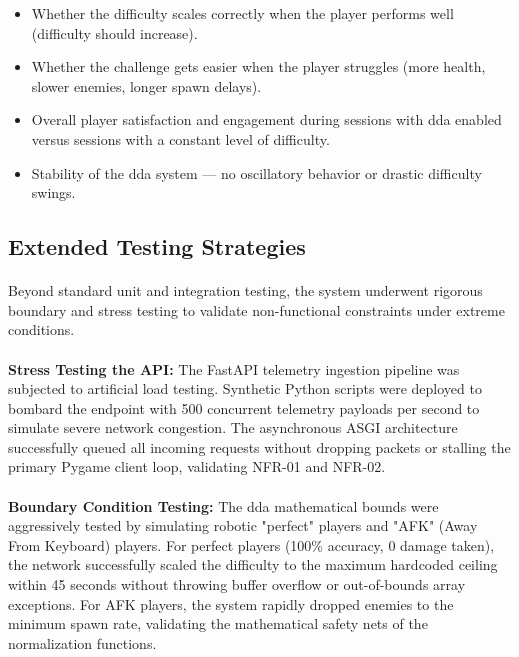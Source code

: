 \begin{itemize}
	\item Whether the difficulty scales correctly when the player performs well (difficulty should increase).
	\item Whether the challenge gets easier when the player struggles (more health, slower enemies, longer spawn delays).
	\item Overall player satisfaction and engagement during sessions with \ac{dda} enabled versus sessions with a constant level of difficulty.
	\item Stability of the \ac{dda} system — no oscillatory behavior or drastic difficulty swings.
\end{itemize}

\subsection{Extended Testing Strategies}
\paragraph{} Beyond standard unit and integration testing, the system underwent rigorous boundary and stress testing to validate non-functional constraints under extreme conditions.
\paragraph{} \textbf{Stress Testing the API:} The FastAPI telemetry ingestion pipeline was subjected to artificial load testing. Synthetic Python scripts were deployed to bombard the endpoint with 500 concurrent telemetry payloads per second to simulate severe network congestion. The asynchronous ASGI architecture successfully queued all incoming requests without dropping packets or stalling the primary Pygame client loop, validating NFR-01 and NFR-02.
\paragraph{} \textbf{Boundary Condition Testing:} The \ac{dda} mathematical bounds were aggressively tested by simulating robotic "perfect" players and "AFK" (Away From Keyboard) players. For perfect players (100\% accuracy, 0 damage taken), the network successfully scaled the difficulty to the maximum hardcoded ceiling within 45 seconds without throwing buffer overflow or out-of-bounds array exceptions. For AFK players, the system rapidly dropped enemies to the minimum spawn rate, validating the mathematical safety nets of the normalization functions.
